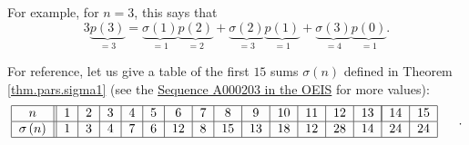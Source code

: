For example, for $n=3$, this says that%
\[
3\underbrace{p\left(  3\right)  }_{=3}=\underbrace{\sigma\left(  1\right)
}_{=1}\underbrace{p\left(  2\right)  }_{=2}+\underbrace{\sigma\left(
2\right)  }_{=3}\underbrace{p\left(  1\right)  }_{=1}+\underbrace{\sigma
\left(  3\right)  }_{=4}\underbrace{p\left(  0\right)  }_{=1}.
\]


For reference, let us give a table of the first $15$ sums $\sigma\left(
n\right)  $ defined in Theorem \ref{thm.pars.sigma1} (see the
\href{https://oeis.org/A000203}{Sequence A000203 in the OEIS} for more
values):%
\[%
\begin{tabular}
[c]{|c||c|c|c|c|c|c|c|c|c|c|c|c|c|c|c|}\hline
$n$ & $1$ & $2$ & $3$ & $4$ & $5$ & $6$ & $7$ & $8$ & $9$ & $10$ & $11$ & $12$
& $13$ & \multicolumn{1}{|c|}{$14$} & $15$\\\hline
$\sigma\left(  n\right)  $ & $1$ & $3$ & $4$ & $7$ & $6$ & $12$ & $8$ & $15$ &
$13$ & $18$ & $12$ & $28$ & $14$ & $24$ & $24$\\\hline
\end{tabular}
\ \ \ \ \ .
\]


